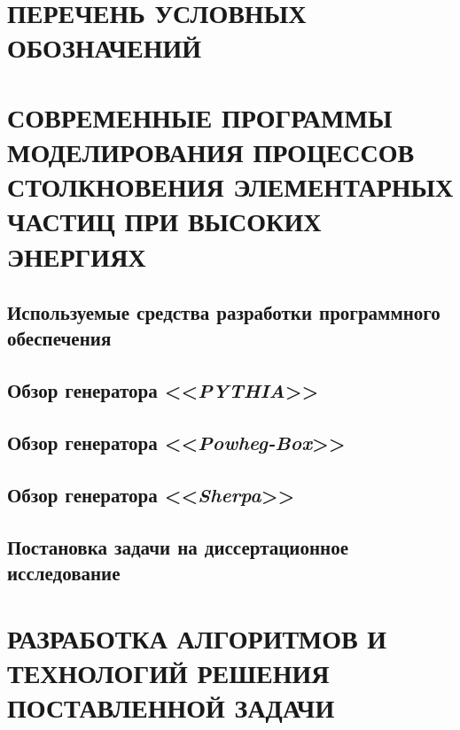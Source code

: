 \documentclass[12pt,a4paper]{styles/report}
\begin{document}
	
\renewcommand\contentsname{ОГЛАВЛЕНИЕ}
\renewcommand{\bibname}{БИБЛИОГРАФИЧЕСКИЙ СПИСОК}
\renewcommand\chaptername{ГЛАВА}
\renewcommand\figurename{Рисунок}
\renewcommand\tablename{Таблица}



\newpage
\pagestyle{plain}  \setcounter{page}{2}
\large \tableofcontents

\newpage
\chapter*{ПЕРЕЧЕНЬ УСЛОВНЫХ ОБОЗНАЧЕНИЙ}






\chapter{СОВРЕМЕННЫЕ ПРОГРАММЫ МОДЕЛИРОВАНИЯ ПРОЦЕССОВ СТОЛКНОВЕНИЯ ЭЛЕМЕНТАРНЫХ ЧАСТИЦ ПРИ ВЫСОКИХ ЭНЕРГИЯХ}

\section{Используемые средства разработки программного обеспечения}


\section{Обзор генератора <<\textit{PYTHIA}>>}

\section{Обзор генератора <<\textit{Powheg-Box}>>}

\section{Обзор генератора <<\textit{Sherpa}>>}

\section{Постановка задачи на диссертационное исследование}


\chapter{РАЗРАБОТКА АЛГОРИТМОВ И ТЕХНОЛОГИЙ РЕШЕНИЯ ПОСТАВЛЕННОЙ ЗАДАЧИ}
\end{document}
